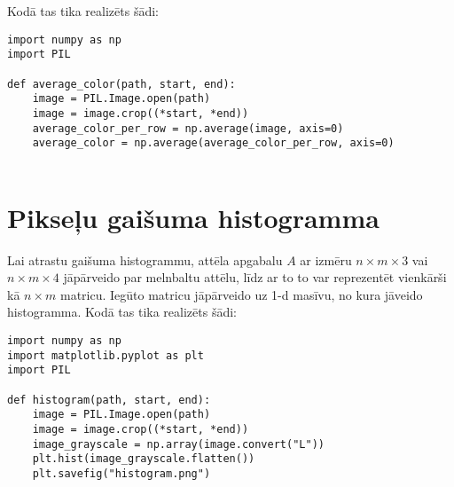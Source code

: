 \documentclass{article}
\begin{document}
Kodā tas tika realizēts šādi:
\begin{lstlisting}
import numpy as np
import PIL

def average_color(path, start, end):
    image = PIL.Image.open(path)
    image = image.crop((*start, *end))
    average_color_per_row = np.average(image, axis=0)
    average_color = np.average(average_color_per_row, axis=0)
    
\end{lstlisting}
\section{Pikseļu gaišuma histogramma}
Lai atrastu gaišuma histogrammu, attēla apgabalu $A$ ar izmēru $n\times m\times 3$ vai $n\times m \times 4$ jāpārveido par melnbaltu attēlu, līdz ar to to var reprezentēt vienkārši kā $n\times m$ matricu. Iegūto matricu jāpārveido uz 1-d masīvu, no kura jāveido histogramma. Kodā tas tika realizēts šādi:
\begin{lstlisting}
import numpy as np
import matplotlib.pyplot as plt
import PIL

def histogram(path, start, end):
    image = PIL.Image.open(path)
    image = image.crop((*start, *end))
    image_grayscale = np.array(image.convert("L"))
    plt.hist(image_grayscale.flatten())
    plt.savefig("histogram.png")
    
\end{lstlisting}
\end{document}

